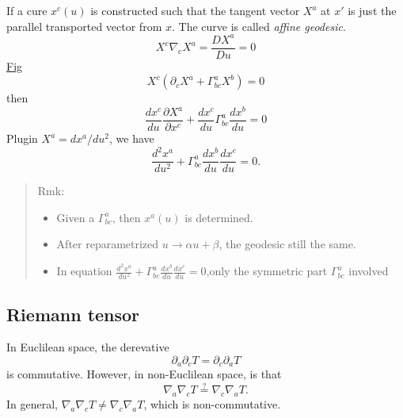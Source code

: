 If a cure $x^{c}(u)$ is constructed such that the tangent vector $X^{a}$ at $x'$ is just the parallel transported vector from $x$. The curve is called \textit{affine geodesic}.
\begin{equation}
X^{c}\nabla_{c}X^{a} = \frac{DX^{a}}{Du} = 0
\end{equation}
\underline{Fig}
\begin{equation}
X^{c}\left(\partial_{c}X^{a} + \Gamma^{a}_{bc} X^{b}\right) = 0
\end{equation}
then 
\begin{equation}
\frac{dx^{c}}{du}\frac{\partial X^{a}}{\partial x^{c}} + \frac{dx^{c}}{du}\Gamma^{a}_{bc} \frac{dx^b}{du} = 0
\end{equation}
Plugin $X^{a} = dx^{a}/du^2$, we have
\begin{equation}
\frac{d^2x^a}{du^2} + \Gamma^{a}_{bc}\frac{dx^b}{du}\frac{dx^{c}}{du} = 0.
\end{equation}


\begin{quote}
	Rmk:
\begin{itemize}
	\item Given a $\Gamma^{a}_{bc}$, then $x^{a}(u)$ is determined.
	\item After reparametrized $u\to \alpha u + \beta$, the geodesic still the same.
	\item In equation $\displaystyle \frac{d^2x^a}{du^2} + \Gamma^{a}_{bc}\frac{dx^b}{du}\frac{dx^{c}}{du} = 0$,only the symmetric part $\Gamma^{a}_{bc}$ involved

\end{itemize}

\end{quote}

\subsection{Riemann tensor} %

In Euclilean space, the derevative
\begin{equation}
\partial_{a}\partial_{c}T = \partial_{c}\partial_{a}T
\end{equation}
 is commutative. However, in non-Euclilean space, is that
\begin{equation}
\nabla_{a}\nabla_{c} T \stackrel{?}{=} \nabla_{c}\nabla_{a} T.
\end{equation}
In general, $\nabla_{a}\nabla_{c} T \neq \nabla_{c}\nabla_{a} T$, which is non-commutative. 

